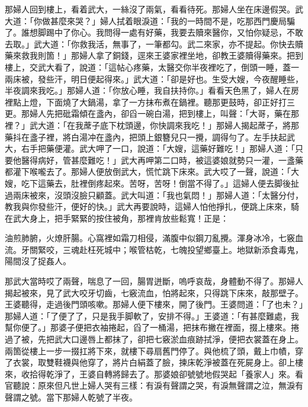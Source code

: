 那婦人回到樓上，看着武大，一絲沒了兩氣，看看待死。那婦人坐在床邊假哭。武大道：「你做甚麼來哭？」婦人拭着眼淚道：「我的一時間不是，吃那西門慶局騙了。誰想脚踢中了你心。我問得一處有好藥，我要去贖來醫你，又怕你疑忌，不敢去取。」武大道：「你救我活，無事了，一筆都勾。武二來家，亦不提起。你快去贖藥來救我則箇！」那婦人拿了銅錢，逕來王婆家裡坐地，卻教王婆贖得藥來。把到樓上，交武大看了，說道：「這帖心疼藥，太醫交你半夜裡吃了，倒頭一睡，蓋一兩床被，發些汗，明日便起得來。」武大道：「卻是好也。生受大嫂，今夜醒睡些，半夜調來我吃。」{}那婦人道：「你放心睡，我自扶持你。」{}看看天色黑了，婦人在房裡點上燈，下面燒了大鍋湯，拿了一方抹布煮在鍋裡。聽那更鼓時，卻正好打三更。那婦人先把砒霜傾在盞內，卻舀一碗白湯，把到樓上，叫聲：「大哥，藥在那裡？」武大道：「在我蓆子底下枕頭邊，你快調來我吃！」{}那婦人揭起蓆子，將那藥抖在盞子裡，將白湯冲在盞內，把頭上銀簪兒只一攪，調得勻了。左手扶起武大，右手把藥便灌。武大呷了一口，說道：「大嫂，這藥好難吃！」那婦人道：「只要他醫得病好，{}管甚麼難吃！」武大再呷第二口時，被這婆娘就勢只一灌，一盞藥都灌下喉嚨去了。那婦人便放倒武大，慌忙跳下床來。武大哎了一聲，說道：「大嫂，吃下這藥去，肚裡倒疼起來。苦呀，苦呀！倒當不得了。」這婦人便去脚後扯過兩床被來，沒頭沒臉只顧蓋。武大叫道：「我也氣悶！」那婦人道：「太醫分付，教我與你發些汗，便好的快。」武大再要說時，這婦人怕他掙扎，便跳上床來，騎在武大身上，把手緊緊的按住被角，那裡肯放些鬆寬！正是：

\begin{myquote} 
油煎肺腑，火燎肝腸。心窩裡如霜刀相侵，滿腹中似鋼刀亂攪。渾身冰冷，七竅血流。牙關緊咬，三魂赴枉死城中；喉管枯乾，七魄投望鄉臺上。地獄新添食毒鬼，陽間沒了捉姦人。
\end{myquote} 

那武大當時哎了兩聲，喘息了一回，腸胃迸斷，嗚呼哀哉，身體動不得了。那婦人揭起被來，見了武大咬牙切齒，七竅流血，怕將起來，只得跳下床來，敲那壁子。王婆聽得，走過後門頭咳嗽。那婦人便下樓來，開了後門。王婆問道：「了也未？」那婦人道：「了便了了，只是我手脚軟了，安排不得。」王婆道：「有甚麼難處，我幫你便了。」那婆子便把衣袖捲起，舀了一桶湯，把抹布撇在裡面，掇上樓來。捲過了被，先把武大口邊唇上都抹了，卻把七竅淤血痕跡拭淨，便把衣裳蓋在身上。兩箇從樓上一步一掇扛將下來，就樓下尋扇舊門停了。與他梳了頭，戴上巾幘，穿了衣裳，取雙鞋襪與他穿了，將片白絹蓋了臉，揀床乾淨被蓋在死屍身上。卻上樓來，收拾得乾淨了，王婆自轉將歸去了。那婆娘卻號號地假哭起「養家人」來。看官聽說：原來但凡世上婦人哭有三樣：有淚有聲謂之哭，有淚無聲謂之泣，無淚有聲謂之號。當下那婦人乾號了半夜。

